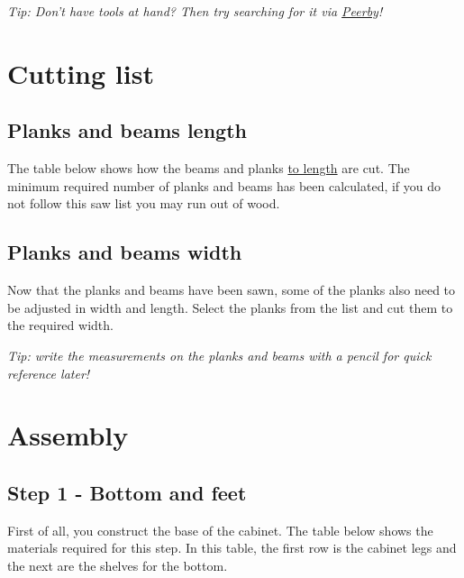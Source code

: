\documentclass{article}
\begin{document}
\begin{center}
    \textit{Tip: Don't have tools at hand? Then try searching for it via \href{https://www.peerby.com/}{Peerby}!}
\end{center}

\clearpage
\newpage

\section{Cutting list}

\subsection{Planks and beams length}

The table below shows how the beams and planks \underline{to length} are cut. The minimum required number of planks and beams has been calculated, if you do not follow this saw list you may run out of wood.





\subsection{Planks and beams width}

Now that the planks and beams have been sawn, some of the planks also need to be adjusted in width and length. Select the planks from the list and cut them to the required width. \\

\begin{center}
    \textit{Tip: write the measurements on the planks and beams with a pencil for quick reference later!}
\end{center}



\clearpage
\newpage

\section{Assembly}

\subsection{Step 1 - Bottom and feet}

First of all, you construct the base of the cabinet. The table below shows the materials required for this step. In this table, the first row is the cabinet legs and the next are the shelves for the bottom.
\end{document}
